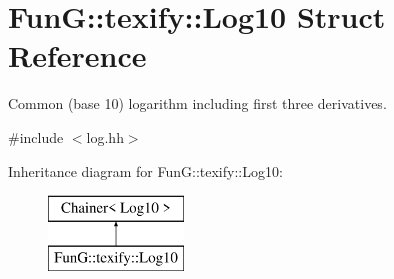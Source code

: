 \hypertarget{structFunG_1_1texify_1_1Log10}{\section{Fun\-G\-:\-:texify\-:\-:Log10 Struct Reference}
\label{structFunG_1_1texify_1_1Log10}
}


Common (base 10) logarithm including first three derivatives.  




{\ttfamily \#include $<$log.\-hh$>$}

Inheritance diagram for Fun\-G\-:\-:texify\-:\-:Log10\-:\begin{figure}[H]
\begin{center}
\leavevmode
\includegraphics[height=2.000000cm]{structFunG_1_1texify_1_1Log10}
\end{center}
\end{figure}
